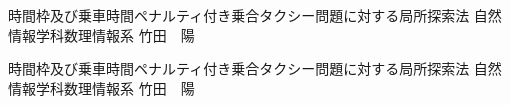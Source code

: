 \documentclass{tarticle}
\begin{document}
時間枠及び乗車時間ペナルティ付き乗合タクシー問題に対する局所探索法
\hspace{1cm}
自然情報学科数理情報系
\hspace{1cm}
竹田　陽

\vspace{2cm}
時間枠及び乗車時間ペナルティ付き乗合タクシー問題に対する局所探索法
\hspace{1cm}
自然情報学科数理情報系
\hspace{1cm}
竹田　陽
\end{document}
